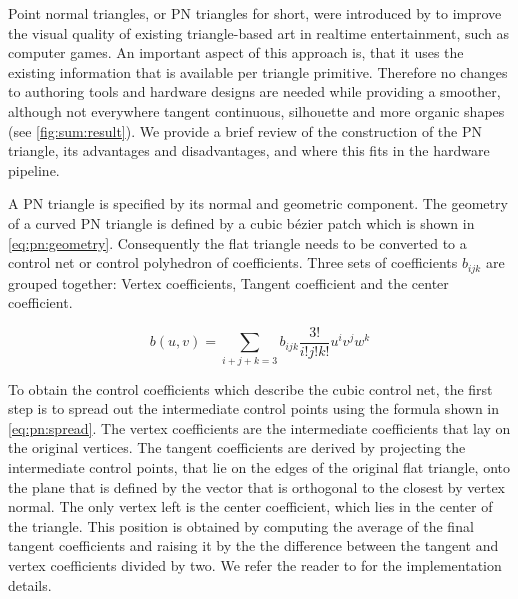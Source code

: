 \noindent Point normal triangles, or PN triangles for short, were introduced by \textcite{vlachos2001curved} to improve the visual quality of existing triangle-based art in realtime entertainment, such as computer games. An important aspect of this approach is, that it uses the existing information that is available per triangle primitive. Therefore no changes to authoring tools and hardware designs are needed while providing a smoother, although not everywhere tangent continuous, silhouette and more organic shapes (see \cref{fig:sum:result}). We provide a brief review of the construction of the PN triangle, its advantages and disadvantages, and where this fits in the hardware pipeline. 

\begin{figure*}
	\centering
	\caption{From left to right (a) Input triangulation, (b) Gouraud shaded input triangulation, (c) geometric component of the PN triangles (shaded according to surface normal variation), and (d) curved PN Triangles (shaded with independently constructed quadratically varying normals)}
	\label{fig:sum:result}
\end{figure*}

A PN triangle is specified by its normal and geometric component. The geometry of a curved PN triangle is defined by a cubic b\'ezier patch which is shown in \eqref{eq:pn:geometry}. Consequently the flat triangle needs to be converted to a control net or control polyhedron of coefficients. Three sets of coefficients $b_{ijk}$ are grouped together: Vertex coefficients, Tangent coefficient and the center coefficient.

\begin{equation}\label{eq:pn:geometry}
	b(u,v) = \sum\limits_{i+j+k=3} b_{ijk} \frac{3!}{i!j!k!} u^i v^j w^k
\end{equation}

To obtain the control coefficients which describe the cubic control net, the first step is to spread out the intermediate control points using the formula shown in \eqref{eq:pn:spread}. The vertex coefficients are the intermediate coefficients that lay on the original vertices. The tangent coefficients are derived by projecting the intermediate control points, that lie on the edges of the original flat triangle, onto the plane that is defined by the vector that is orthogonal to the closest by vertex normal. The only vertex left is the center coefficient, which lies in the center of the triangle. This position is obtained by computing the average of the final tangent coefficients and raising it by the the difference between the tangent and vertex coefficients divided by two. We refer the reader to \textcite{vlachos2001curved} for the implementation details.

